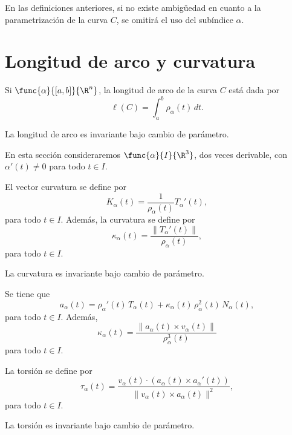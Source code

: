 \documentclass[a4,11pt]{aleph-notas}
\begin{document}
\begin{advertencia}
    En las definiciones anteriores, si no existe ambigüedad en cuanto a la parametrización de la curva $C$, se omitirá el uso del subíndice $\alpha$.
\end{advertencia}

\section{Longitud de arco y curvatura}

\begin{defi}
    Si $\func{\alpha}{[a,b]}{\R^n}$, la longitud de arco de la curva $C$ está dada por
    \[
        \ell(C)=\int_a^b \rho_\alpha(t)\, dt.
    \]
\end{defi}

\begin{prop}
    La longitud de arco es invariante bajo cambio de parámetro.
\end{prop}

En esta sección consideraremos $\func{\alpha}{I}{\R^3}$, dos veces derivable, con $\alpha'(t)\neq 0$ para todo $t\in I$.

\begin{defi}[Curvatura]
    El vector curvatura se define por
    \[
        K_\alpha(t)=\frac{1}{\rho_\alpha(t)}T_\alpha'(t),
    \]
    para todo $t\in I$. Además, la curvatura se define por
    \[
        \kappa_\alpha(t)=\frac{\|T_\alpha'(t)\|}{\rho_\alpha(t)},
    \]
    para todo $t\in I$.
\end{defi}

\begin{prop}
    La curvatura es invariante bajo cambio de parámetro.
\end{prop}

\begin{prop}
    Se tiene que
    \[
        a_\alpha(t)=\rho_\alpha'(t)\, T_\alpha(t) + \kappa_\alpha(t)\, \rho^2_\alpha(t)\, N_\alpha(t),
    \]
    para todo $t\in I$. Además,
    \[
        \kappa_\alpha(t) = \frac{\|a_\alpha(t)\times v_\alpha(t)\|}{\rho^3_\alpha(t)}
    \]
    para todo $t\in I$.
\end{prop}

\begin{defi}[Torsión]
    La torsión se define por
    \[
        \tau_\alpha(t)= \frac{v_\alpha(t)\cdot(a_\alpha(t)\times a_\alpha'(t))}{\| v_\alpha(t)\times a_\alpha(t) \|^2},
    \]
    para todo $t\in I$.
\end{defi}

\begin{prop}
    La torsión es invariante bajo cambio de parámetro.
\end{prop}
\end{document}
